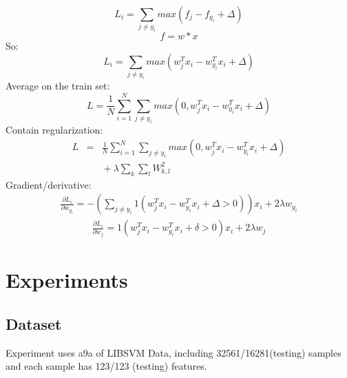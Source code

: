 \documentclass[journal, a4paper]{IEEEtran}
\begin{document}
\begin{displaymath}
L_i=\sum_{j\not=y_i}max(f_j-f_{y_i}+\Delta)
\end{displaymath}
\begin{displaymath}
f=w*x
\end{displaymath}
So:
\begin{displaymath}
L_i=\sum_{j\not=y_i}max(w^T_jx_i-w^T_{y_i}x_i+\Delta)
\end{displaymath}
Average on the train set:
\begin{displaymath}
L=\frac{1}{N}\sum_{i=1}^N\sum_{j\not=y_i}max(0,w^T_jx_i-w^T_{y_i}x_i+\Delta)
\end{displaymath}
Contain regularization:
\begin{eqnarray}
L & = & \frac{1}{N}\sum_{i=1}^N\sum_{j\not=y_i}max(0,w^T_jx_i-w^T_{y_i}x_i+\Delta){}
\nonumber\\
& & {}+ \lambda \sum_k\sum_l W_{k,l}^2
\end{eqnarray}
Gradient/derivative:
\begin{eqnarray}
\frac{\partial L_i}{\partial w_{y_i}}=-(\sum_{j\not=y_i}1(w_j^Tx_i - w_{y_i}^T x_i+\Delta >0))x_i+2\lambda w_{y_i}
\end{eqnarray}
\begin{eqnarray}
\frac{\partial L_i}{\partial w_{j}}=1(w_j^Tx_i-w_{y_i}^Tx_i+\delta>0)x_i+2\lambda w_j
\end{eqnarray}

\section{Experiments}
\subsection{Dataset}
Experiment uses a9a of LIBSVM Data, including 32561/16281(testing) samples and each sample has 123/123 (testing) features.
\end{document}
